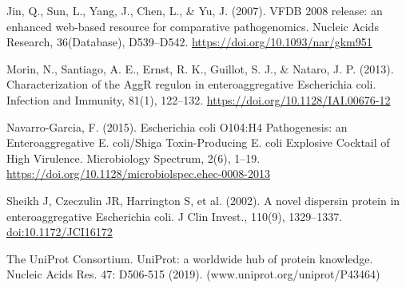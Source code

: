 \documentclass[12pt,]{article}
\begin{document}
Jin, Q., Sun, L., Yang, J., Chen, L., \& Yu, J. (2007). VFDB 2008
release: an enhanced web-based resource for comparative pathogenomics.
Nucleic Acids Research, 36(Database), D539--D542.
\url{https://doi.org/10.1093/nar/gkm951}

Morin, N., Santiago, A. E., Ernst, R. K., Guillot, S. J., \& Nataro, J.
P. (2013). Characterization of the AggR regulon in enteroaggregative
Escherichia coli. Infection and Immunity, 81(1), 122--132.
\url{https://doi.org/10.1128/IAI.00676-12}

Navarro-Garcia, F. (2015). Escherichia coli O104:H4 Pathogenesis: an
Enteroaggregative E. coli/Shiga Toxin-Producing E. coli Explosive
Cocktail of High Virulence. Microbiology Spectrum, 2(6), 1--19.
\url{https://doi.org/10.1128/microbiolspec.ehec-0008-2013}

Sheikh J, Czeczulin JR, Harrington S, et al. (2002). A novel dispersin
protein in enteroaggregative Escherichia coli. J Clin Invest., 110(9),
1329--1337. \url{doi:10.1172/JCI16172}

The UniProt Consortium. UniProt: a worldwide hub of protein knowledge.
Nucleic Acids Res. 47: D506-515 (2019). (www.uniprot.org/uniprot/P43464)
\end{document}
